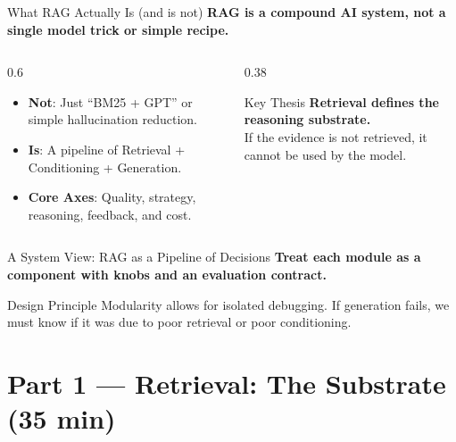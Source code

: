 \documentclass[aspectratio=169, xcolor=table]{beamer}
\newif\ifanimated
\newcommand{\cpause}{\ifanimated\pause\fi}
\begin{document}
\begin{frame}{What RAG Actually Is (and is not)}
\textbf{RAG is a compound AI system, not a single model trick or simple recipe.}

\vspace{0.8em}
\begin{columns}[T]
\begin{column}{0.6\textwidth}
\begin{itemize}
    \item \textbf{Not}: Just ``BM25 + GPT'' or simple hallucination reduction.
    \item \textbf{Is}: A pipeline of Retrieval + Conditioning + Generation.
    \item \textbf{Core Axes}: Quality, strategy, reasoning, feedback, and cost.
\end{itemize}
\end{column}
\begin{column}{0.38\textwidth}
\begin{alertblock}{Key Thesis}
\textbf{Retrieval defines the reasoning substrate.}\\
If the evidence is not retrieved, it cannot be used by the model.
\end{alertblock}
\end{column}
\end{columns}
\end{frame}

\begin{frame}{A System View: RAG as a Pipeline of Decisions}
\textbf{Treat each module as a component with knobs and an evaluation contract.}

\vspace{0.5em}
\begin{center}
\resizebox{0.75\textwidth}{!}{

}
\end{center}

\cpause
\vspace{0.5em}
\begin{block}{Design Principle}
Modularity allows for isolated debugging. If generation fails, we must know if it was due to poor retrieval or poor conditioning.
\end{block}
\end{frame}

\section{Part 1 --- Retrieval: The Substrate (35 min)}
\end{document}
